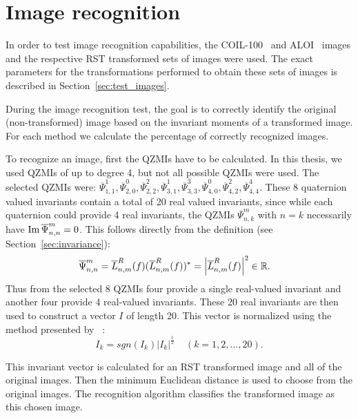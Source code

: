 \section{Image recognition}
In order to test image recognition capabilities, the COIL-100~\cite{coil} and ALOI~\cite{aloi} images and the respective RST transformed sets of images were used. The exact parameters for the transformations performed to obtain these sets of images is described in Section~\ref{sec:test_images}.

During the image recognition test, the goal is to correctly identify the original (non-transformed) image based on the invariant moments of a transformed image. For each method we calculate the percentage of correctly recognized images.

To recognize an image, first the QZMIs have to be calculated. In this thesis, we used QZMIs of up to degree 4, but not all possible QZMIs were used. The selected QZMIs were: $\overline{\Psi}_{1,1}^1, \overline{\Psi}_{2,0}^0, \overline{\Psi}_{2,2}^2, \overline{\Psi}_{3,1}^1, \overline{\Psi}_{3,3}^3, \overline{\Psi}_{4,0}^0, \overline{\Psi}_{4,2}^2, \overline{\Psi}_{4,4}^4$. These 8 quaternion valued invariants contain a total of 20 real valued invariants, since while each quaternion could provide 4 real invariants, the QZMIs $\overline{\Psi}_{n,k}^m$ with $n = k$ necessarily have $\operatorname{Im}{\overline{\Psi}_{n,n}^m} = 0$.
This follows directly from the definition (see Section~\ref{sec:invariance}): 
\begin{gather*}
    \begin{split}
        \overline{\Psi}_{n,n}^m &= \overline{L}_{n,m}^R(f)(\overline{L}_{n,m}^R(f))^* = \left|\overline{L}_{n,m}^R(f)\right|^2 \in \mathbb{R}.
    \end{split}
\end{gather*}
Thus from the selected 8 QZMIs four provide a single real-valued invariant and another four provide 4 real-valued invariants. These 20 real invariants are then used to construct a vector $I$ of length 20.
This vector is normalized using the method presented by \citeauthor{affine_color}~\cite{affine_color}:
$$
I_k = sgn(I_k)\left|I_k\right|^\frac{1}{2} \;\;\;\; (k = 1,2,\ldots,20).
$$

This invariant vector is calculated for an RST transformed image and all of the original images. Then the minimum Euclidean distance is used to choose from the original images. The recognition algorithm classifies the transformed image as this chosen image.

